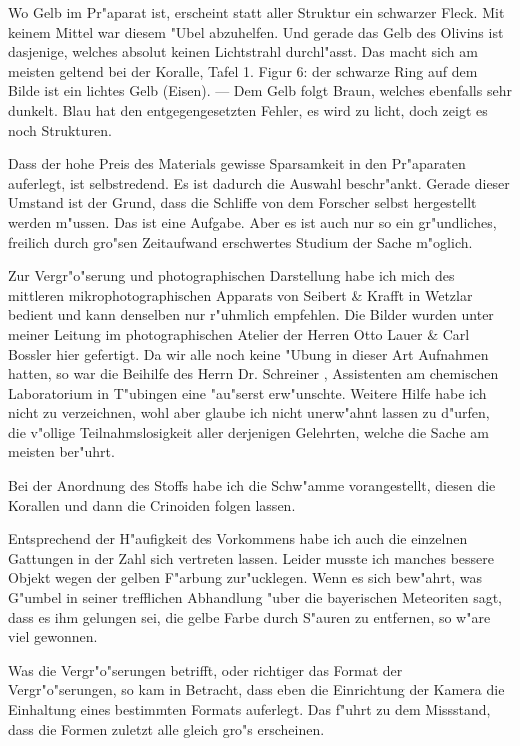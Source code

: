 \documentclass[a4paper, 11pt, oneside]{article}
\begin{document}
Wo Gelb im Pr"aparat ist, erscheint statt aller Struktur ein schwarzer Fleck. Mit keinem Mittel war diesem "Ubel abzuhelfen. Und gerade das Gelb des Olivins ist dasjenige, welches absolut keinen Lichtstrahl durchl"asst. Das macht sich am meisten geltend bei der Koralle, Tafel 1. Figur 6: der schwarze Ring auf dem Bilde ist ein lichtes Gelb (Eisen). --- Dem Gelb folgt Braun, welches ebenfalls sehr dunkelt. Blau hat den entgegengesetzten Fehler, es wird zu licht, doch zeigt es noch Strukturen.

Dass der hohe Preis des Materials gewisse Sparsamkeit in den Pr"aparaten auferlegt, ist selbstredend. Es ist dadurch die Auswahl beschr"ankt. Gerade dieser Umstand ist der Grund, dass die Schliffe von dem Forscher selbst hergestellt werden m"ussen. Das ist eine Aufgabe. Aber es ist auch nur so ein gr"undliches, freilich durch gro"sen Zeitaufwand erschwertes Studium der Sache m"oglich.

Zur Vergr"o"serung und photographischen Darstellung habe ich mich des mittleren mikrophotographischen Apparats von Seibert \& Krafft in Wetzlar bedient und kann denselben nur r"uhmlich empfehlen. Die Bilder wurden unter meiner Leitung im photographischen Atelier der Herren Otto Lauer \& Carl Bossler hier gefertigt. Da wir alle noch keine "Ubung in dieser Art Aufnahmen hatten, so war die Beihilfe des Herrn Dr. Schreiner , Assistenten am chemischen Laboratorium in T"ubingen eine "au"serst erw"unschte. Weitere Hilfe habe ich nicht zu verzeichnen, wohl aber glaube ich nicht unerw"ahnt lassen zu d"urfen, die v"ollige Teilnahmslosigkeit aller derjenigen Gelehrten, welche die Sache am meisten ber"uhrt.

Bei der Anordnung des Stoffs habe ich die Schw"amme vorangestellt, diesen die Korallen und dann die Crinoiden folgen lassen.

Entsprechend der H"aufigkeit des Vorkommens habe ich auch die einzelnen Gattungen in der Zahl sich vertreten lassen. Leider musste ich manches bessere Objekt wegen der gelben F"arbung zur"ucklegen. Wenn es sich bew"ahrt, was G"umbel in seiner trefflichen Abhandlung "uber die bayerischen Meteoriten sagt, dass es ihm gelungen sei, die gelbe Farbe durch S"auren zu entfernen, so w"are viel gewonnen.

Was die Vergr"o"serungen betrifft, oder richtiger das Format der Vergr"o"serungen, so kam in Betracht, dass eben die Einrichtung der Kamera die Einhaltung eines bestimmten Formats auferlegt. Das f"uhrt zu dem Missstand, dass die Formen zuletzt alle gleich gro"s erscheinen.
\end{document}
